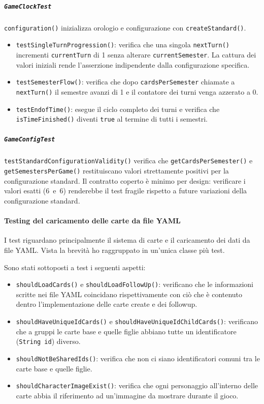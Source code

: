 \documentclass[11pt, a4paper, oneside]{report}
\begin{document}
\subparagraph{\texttt{GameClockTest}}
\texttt{configuration()} inizializza orologio e configurazione con
\texttt{createStandard()}.
\begin{itemize}
    \item \texttt{testSingleTurnProgression()}: verifica che una singola
        \texttt{nextTurn()} incrementi \texttt{currentTurn} di 1 senza
        alterare \texttt{currentSemester}. La cattura dei valori iniziali
        rende l'asserzione indipendente dalla configurazione specifica.
    \item \texttt{testSemesterFlow()}: verifica che dopo
        \texttt{cardsPerSemester} chiamate a \texttt{nextTurn()} il semestre
        avanzi di 1 e il contatore dei turni venga azzerato a 0.
    \item \texttt{testEndofTime()}: esegue il ciclo completo dei turni e
        verifica che \texttt{isTimeFinished()} diventi \texttt{true} al
        termine di tutti i semestri.
\end{itemize}

\subparagraph{\texttt{GameConfigTest}}
\texttt{testStandardConfigurationValidity()} verifica che
\texttt{getCardsPerSemester()} e \texttt{getSemestersPerGame()} restituiscano
valori strettamente positivi per la configurazione standard. Il contratto
coperto \`e minimo per design: verificare i valori esatti (6~e~6) renderebbe
il test fragile rispetto a future variazioni della configurazione standard.

\paragraph{Testing del caricamento delle carte da file YAML} 
I test riguardano principalmente il sistema di carte e il caricamento dei dati da file YAML. Vista la brevità ho raggruppato in un'unica classe più test.

Sono stati sottoposti a test i seguenti aspetti:
\begin{itemize}
    \item \texttt{shouldLoadCards()} e \texttt{shouldLoadFollowUp()}: verificano che le informazioni scritte nei file 
    YAML coincidano rispettivamente con ciò che è contenuto dentro l'implementazione delle carte create e dei followup.
    \item \texttt{shouldHaveUniqueIdCards()} e \texttt{shouldHaveUniqueIdChildCards()}: verificano che a gruppi le carte base e quelle figlie abbiano tutte un identificatore (\texttt{String id}) diverso.
    \item \texttt{shouldNotBeSharedIds()}: verifica che non ci siano identificatori comuni tra le carte base e quelle figlie.
    \item \texttt{shouldCharacterImageExist()}: verifica che ogni personaggio all'interno delle carte abbia il riferimento ad un'immagine da mostrare durante il gioco.
\end{itemize}
\end{document}
